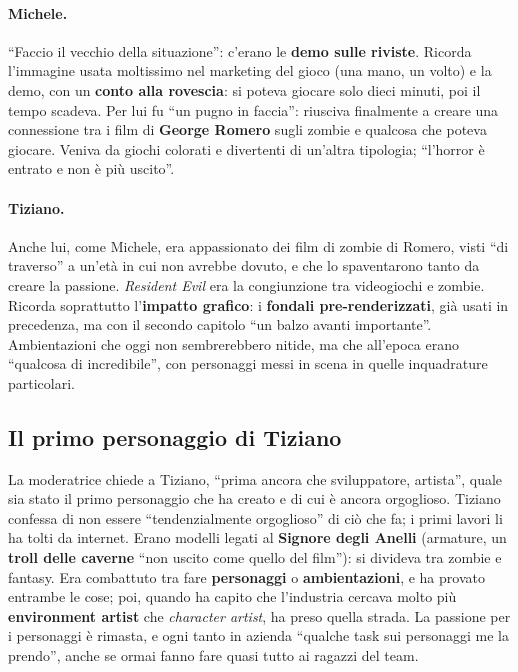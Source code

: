 \paragraph{Michele.} ``Faccio il vecchio della situazione'': c'erano le
\textbf{demo sulle riviste}. Ricorda l'immagine usata moltissimo nel marketing
del gioco (una mano, un volto) e la demo, con un \textbf{conto alla rovescia}:
si poteva giocare solo dieci minuti, poi il tempo scadeva. Per lui fu ``un pugno
in faccia'': riusciva finalmente a creare una connessione tra i film di
\textbf{George Romero} sugli zombie e qualcosa che poteva giocare. Veniva da
giochi colorati e divertenti di un'altra tipologia; ``l'horror è entrato e non è
più uscito''.

\paragraph{Tiziano.} Anche lui, come Michele, era appassionato dei film di zombie
di Romero, visti ``di traverso'' a un'età in cui non avrebbe dovuto, e che lo
spaventarono tanto da creare la passione. \emph{Resident Evil} era la
congiunzione tra videogiochi e zombie. Ricorda soprattutto l'\textbf{impatto
grafico}: i \textbf{fondali pre-renderizzati}, già usati in precedenza, ma con
il secondo capitolo ``un balzo avanti importante''. Ambientazioni che oggi non
sembrerebbero nitide, ma che all'epoca erano ``qualcosa di incredibile'', con
personaggi messi in scena in quelle inquadrature particolari.

\subsection{Il primo personaggio di Tiziano}

La moderatrice chiede a Tiziano, ``prima ancora che sviluppatore, artista'',
quale sia stato il primo personaggio che ha creato e di cui è ancora orgoglioso.
Tiziano confessa di non essere ``tendenzialmente orgoglioso'' di ciò che fa; i
primi lavori li ha tolti da internet. Erano modelli legati al \textbf{Signore
degli Anelli} (armature, un \textbf{troll delle caverne} ``non uscito come quello
del film''): si divideva tra zombie e fantasy. Era combattuto tra fare
\textbf{personaggi} o \textbf{ambientazioni}, e ha provato entrambe le cose; poi,
quando ha capito che l'industria cercava molto più \textbf{environment artist}
che \emph{character artist}, ha preso quella strada. La passione per i
personaggi è rimasta, e ogni tanto in azienda ``qualche task sui personaggi me
la prendo'', anche se ormai fanno fare quasi tutto ai ragazzi del team.

